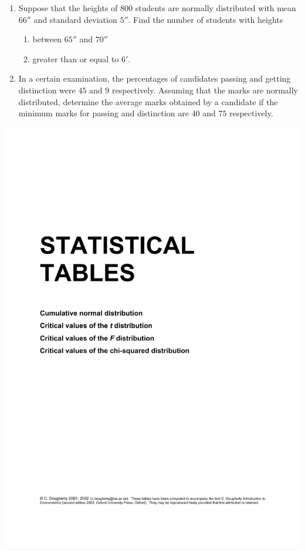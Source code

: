 \documentclass[svgnames]{amsart}
\begin{document}
\begin{enumerate}[leftmargin=*]
\item Suppose that the heights of $800$ students are normally distributed with mean $66''$ and standard deviation $5''$. Find the number of students with heights
\begin{enumerate}
	\item between $65''$ and $70''$
	\item greater than or equal to $6'$.
\end{enumerate}

\item In a certain examination, the percentages of candidates passing and getting distinction were $45$ and $9$ respectively. Assuming that the marks are normally distributed, determine the average marks obtained by a candidate if the minimum marks for passing and distinction are $40$ and $75$ respectively.
\end{enumerate}

\includegraphics[trim = 65 30 50 95, clip, page=2, width=\linewidth]{Statistical Tables.pdf}
\end{document}
